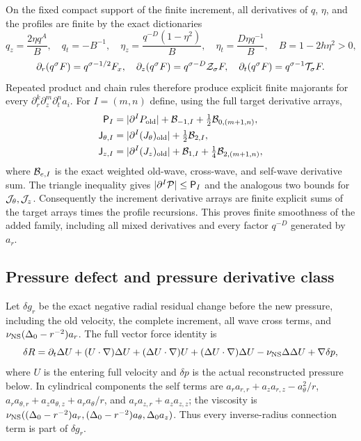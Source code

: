 On the fixed compact support of the finite increment, all derivatives of
$q$, $\eta$, and the profiles are finite by the exact dictionaries
\[
 q_z=\frac{2\eta q^A}{B},\quad q_t=-B^{-1},\quad
 \eta_z=\frac{q^{-D}(1-\eta^2)}B,\quad
 \eta_t=\frac{D\eta q^{-1}}B,
 \quad B=1-2h\eta^2>0,
\]
\[
 \partial_r(q^\sigma F)=q^{\sigma-1/2}F_x,\quad
 \partial_z(q^\sigma F)=q^{\sigma-D}{\cal Z}_\sigma F,\quad
 \partial_t(q^\sigma F)=q^{\sigma-1}{\cal T}_\sigma F.
\]
Repeated product and chain rules therefore produce explicit finite
majorants for every $\partial_r^k\partial_z^m\partial_t^n a_i$.
For $I=(m,n)$ define, using the full target derivative arrays,
\begin{equation}\label{mccp:target_majorants}
\begin{aligned}
 \mathsf P_I&=|\partial^IP_{\rm old}|+{\cal B}_{-1,I}
                         +\tfrac12{\cal B}_{0,(m+1,n)},\\
 \mathsf J_{\theta,I}&=|\partial^I(J_\theta)_{\rm old}|
                         +\tfrac12{\cal B}_{2,I},\\
 \mathsf J_{z,I}&=|\partial^I(J_z)_{\rm old}|+{\cal B}_{1,I}
                         +\tfrac14{\cal B}_{2,(m+1,n)},
\end{aligned}
\end{equation}
where ${\cal B}_{e,I}$ is the exact weighted old-wave, cross-wave, and
self-wave derivative sum. The triangle inequality gives
$|\partial^I{\cal P}|\le\mathsf P_I$ and the analogous two bounds for
${\cal J}_\theta,{\cal J}_z$. Consequently the increment derivative
arrays are finite explicit sums of the target arrays times the profile
recursions. This proves finite smoothness of the added family, including
all mixed derivatives and every factor $q^{-D}$ generated by $a_r$.

\subsection{Pressure defect and pressure derivative class}

Let $\delta g_r$ be the exact negative radial residual change before the
new pressure, including the old velocity, the complete increment, all
wave cross terms, and $\nu_{\rm NS}(\Delta_0-r^{-2})a_r$. The full vector
force identity is
\begin{equation}\label{mccp:full_force_identity}
 \delta R=\partial_t\Delta U+(U\cdot\nabla)\Delta U
 +(\Delta U\cdot\nabla)U+(\Delta U\cdot\nabla)\Delta U
 -\nu_{\rm NS}\Delta\Delta U+\nabla\delta p,
\end{equation}
where $U$ is the entering full velocity and $\delta p$ is the actual
reconstructed pressure below. In cylindrical components the self terms
are $a_ra_{r,r}+a_za_{r,z}-a_\theta^2/r$,
$a_ra_{\theta,r}+a_za_{\theta,z}+a_ra_\theta/r$, and
$a_ra_{z,r}+a_za_{z,z}$; the viscosity is
$\nu_{\rm NS}((\Delta_0-r^{-2})a_r,
(\Delta_0-r^{-2})a_\theta,\Delta_0a_z)$.
Thus every inverse-radius connection term is part of $\delta g_r$.

